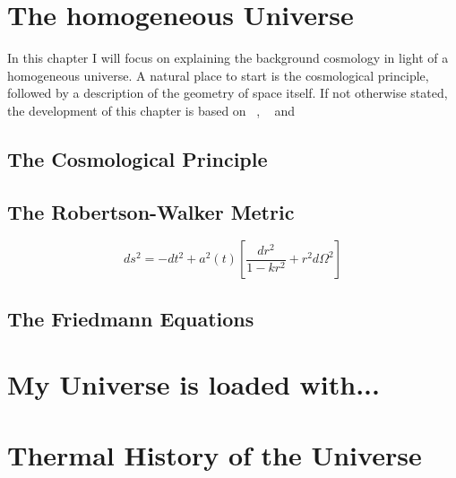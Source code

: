 %
%

\section{The homogeneous Universe}
In this chapter I will focus on explaining the background cosmology in light of a homogeneous universe. A natural place to start is the cosmological principle, followed by a description of the geometry of space itself. If not otherwise stated, the development of this chapter is based on ~\cite{dodelson2020modern}, ~\cite{weinberg2008cosmology} and 

\subsection{The Cosmological Principle}



\subsection{The Robertson-Walker Metric}
\begin{equation}
    ds^2 = -dt^2 + a^2(t) \left[ \frac{dr^2}{1-kr^2} + r^2 d\Omega^2 \right]
\end{equation}

\subsection{The Friedmann Equations}



\section{My Universe is loaded with...}

\section{Thermal History of the Universe}